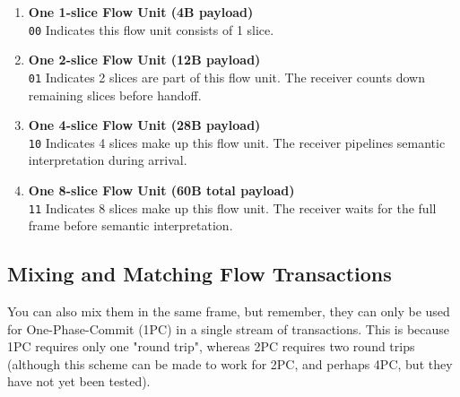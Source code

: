 \documentclass[../../../OAE-SPEC-MAIN.tex]{subfiles}
\begin{document}
\begin{enumerate}
  \item \textbf{One 1-slice Flow Unit (4B payload)} \\
  \texttt{00} Indicates this flow unit consists of 1 slice.

  \item \textbf{One 2-slice Flow Unit (12B payload)} \\
  \texttt{01} Indicates 2 slices are part of this flow unit. The receiver counts down remaining slices before handoff.

  \item \textbf{One 4-slice Flow Unit (28B payload)} \\
  \texttt{10} Indicates 4 slices make up this flow unit. The receiver pipelines semantic interpretation during arrival.

  \item \textbf{One 8-slice Flow Unit (60B total payload)} \\
  \texttt{11} Indicates 8 slices make up this flow unit. The receiver waits for the full frame before semantic interpretation.
\end{enumerate}

\subsection{Mixing and Matching Flow Transactions}


You can also mix them in the same frame, but remember, they can only be used for One-Phase-Commit (1PC) in a single stream of transactions. This is because 1PC requires only one "round trip", whereas 2PC requires two round trips (although this scheme can be made to work for 2PC, and perhaps 4PC, but they have not yet been tested).

 

%
\end{document}
